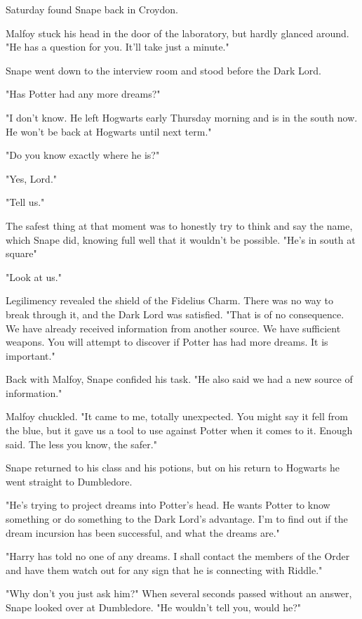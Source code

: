 Saturday found Snape back in Croydon.

Malfoy stuck his head in the door of the laboratory, but hardly glanced around. "He has a question for you. It'll take just a minute."

Snape went down to the interview room and stood before the Dark Lord.

"Has Potter had any more dreams?"

"I don't know. He left Hogwarts early Thursday morning and is in{\el} the south now. He won't be back at Hogwarts until next term."

"Do you know exactly where he is?"

"Yes, Lord."

"Tell us."

The safest thing at that moment was to honestly try to think and say the name, which Snape did, knowing full well that it wouldn't be possible. "He's in{\el} south{\el} at{\el} square{\el}"

"Look at us."

Legilimency revealed the shield of the Fidelius Charm. There was no way to break through it, and the Dark Lord was satisfied. "That is of no consequence. We have already received information from another source. We have sufficient weapons. You will attempt to discover if Potter has had more dreams. It is important."

Back with Malfoy, Snape confided his task. "He also said we had a new source of information."

Malfoy chuckled. "It came to me, totally unexpected. You might say it fell from the blue, but it gave us a tool to use against Potter when it comes to it. Enough said. The less you know, the safer."

Snape returned to his class and his potions, but on his return to Hogwarts he went straight to Dumbledore.

"He's trying to project dreams into Potter's head. He wants Potter to know something or do something to the Dark Lord's advantage. I'm to find out if the dream incursion has been successful, and what the dreams are."

"Harry has told no one of any dreams. I shall contact the members of the Order and have them watch out for any sign that he is connecting with Riddle."

"Why don't you just ask him?" When several seconds passed without an answer, Snape looked over at Dumbledore. "He wouldn't tell you, would he?"

